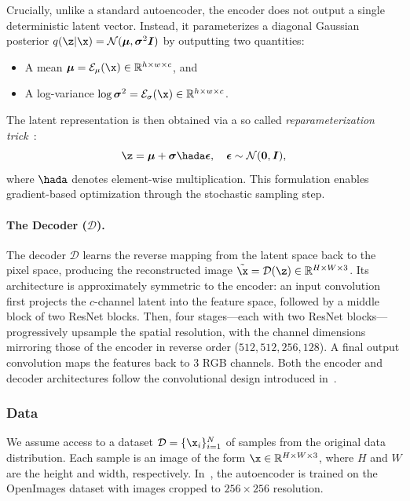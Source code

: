 \documentclass[../../book-main.tex]{subfiles}
\begin{document}
Crucially, unlike a standard autoencoder, the encoder does not output
a single deterministic latent vector. Instead, it parameterizes a
diagonal Gaussian posterior $q(\z | \x) =
\mathcal{N}(\boldsymbol{\mu}, \boldsymbol{\sigma}^2 \boldsymbol{I})$
by outputting two quantities:
\begin{itemize}
\item A mean $\boldsymbol{\mu} = \mathcal{E}_\mu(\x) \in
    \mathbb{R}^{h \times w \times c}$, and
\item A log-variance $\log \boldsymbol{\sigma}^2 =
    \mathcal{E}_\sigma(\x) \in \mathbb{R}^{h \times w \times c}$.
\end{itemize}
The latent representation is then obtained via a so called
\emph{reparameterization trick}~\citep{kingma2013auto}:
\begin{equation}
\z = \boldsymbol{\mu} + \boldsymbol{\sigma} \hada
\boldsymbol{\epsilon}, \quad \boldsymbol{\epsilon} \sim
\mathcal{N}(\boldsymbol{0}, \boldsymbol{I}),
\end{equation}
where $\hada$ denotes element-wise multiplication. This formulation
enables gradient-based optimization through the stochastic sampling step.

\paragraph{The Decoder ($\mathcal{D}$).}
The decoder $\mathcal{D}$ learns the reverse mapping from the latent
space back to the pixel space, producing the reconstructed image
$\tilde{\x} = \mathcal{D}(\z) \in \mathbb{R}^{H \times W \times 3}$.
Its architecture is approximately symmetric to the encoder: an input
convolution first projects the $c$-channel latent into the feature
space, followed by a middle block of two ResNet blocks. Then, four
stages---each with two ResNet blocks---progressively upsample the
spatial resolution, with the channel dimensions mirroring those of
the encoder in reverse order ($512, 512, 256, 128$). A final output
convolution maps the features back to 3 RGB channels. Both the
encoder and decoder architectures follow the convolutional design
introduced in~\citep{esser2021taming}.

\subsubsection{Data}
We assume access to a dataset $\mathcal{D} = \{\x_i\}_{i=1}^N$ of
samples from the original data distribution. Each sample is an image
of the form $\x \in \mathbb{R}^{H \times W \times 3}$, where $H$ and
$W$ are the height and width, respectively.
In~\citep{rombach2022high}, the autoencoder is trained on the
OpenImages dataset with images cropped to $256 \times 256$ resolution.
\end{document}
